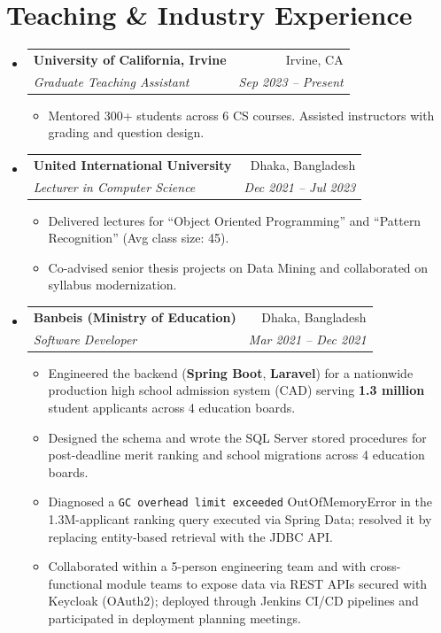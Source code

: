 \documentclass[letterpaper,11pt]{article}
\makeatletter
\newcommand{\resumeItem}[1]{
  \item\small{
    {#1 \vspace{-2pt}}
  }
}
\newcommand{\resumeSubheading}[4]{
  \vspace{-2pt}\item
    \begin{tabular*}{0.97\textwidth}[t]{l@{\extracolsep{\fill}}r}
      \textbf{#1} & #2 \\
      \textit{\small#3} & \textit{\small #4} \\
    \end{tabular*}\vspace{-7pt}
}
\newcommand{\resumeSubHeadingListStart}{\begin{itemize}[leftmargin=0.15in, label={}]}
\newcommand{\resumeSubHeadingListEnd}{\end{itemize}}
\newcommand{\resumeItemListStart}{\begin{itemize}}
\newcommand{\resumeItemListEnd}{\end{itemize}\vspace{-5pt}}
\makeatother
\begin{document}
\section{Teaching \& Industry Experience}
  \resumeSubHeadingListStart

    \resumeSubheading
      {University of California, Irvine}{Irvine, CA}
      {Graduate Teaching Assistant}{Sep 2023 -- Present}
      \resumeItemListStart
        \resumeItem{Mentored 300+ students across 6 CS courses. Assisted instructors with grading and question design.}
      \resumeItemListEnd

    \resumeSubheading
      {United International University}{Dhaka, Bangladesh}
      {Lecturer in Computer Science}{Dec 2021 -- Jul 2023}
      \resumeItemListStart
        \resumeItem{Delivered lectures for ``Object Oriented Programming'' and ``Pattern Recognition'' (Avg class size: 45).}
        \resumeItem{Co-advised senior thesis projects on Data Mining and collaborated on syllabus modernization.}
      \resumeItemListEnd

    \resumeSubheading
      {Banbeis (Ministry of Education)}{Dhaka, Bangladesh}
      {Software Developer}{Mar 2021 -- Dec 2021}
      \resumeItemListStart
        \resumeItem{Engineered the backend (\textbf{Spring Boot}, \textbf{Laravel}) for a nationwide production high school admission system (CAD) serving \textbf{1.3 million} student applicants across 4 education boards.}
        \resumeItem{Designed the schema and wrote the SQL Server stored procedures for post-deadline merit ranking and school migrations across 4 education boards.}
        \resumeItem{Diagnosed a \texttt{GC overhead limit exceeded} OutOfMemoryError in the 1.3M-applicant ranking query executed via Spring Data; resolved it by replacing entity-based retrieval with the JDBC API.}
        \resumeItem{Collaborated within a 5-person engineering team and with cross-functional module teams to expose data via REST APIs secured with Keycloak (OAuth2); deployed through Jenkins CI/CD pipelines and participated in deployment planning meetings.}
      \resumeItemListEnd

  \resumeSubHeadingListEnd


\end{document}
